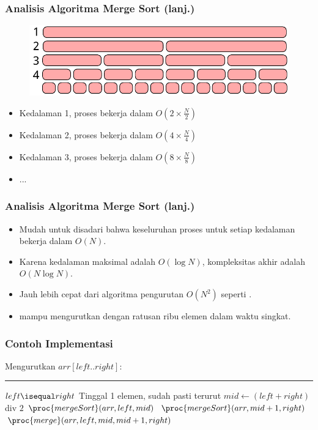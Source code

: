 \begin{frame}
\frametitle{Analisis Algoritma Merge Sort (lanj.)}
\begin{figure}
  \centering
  \includegraphics[width=10 cm]{asset/merge-sort-complexity.pdf}
\end{figure}
\begin{itemize}
  \item Kedalaman 1, proses  bekerja dalam $O(2 \times \frac{N}{2})$
  \item Kedalaman 2, proses  bekerja dalam $O(4 \times \frac{N}{4})$
  \item Kedalaman 3, proses  bekerja dalam $O(8 \times \frac{N}{8})$
  \item ...
\end{itemize}
\end{frame}

\begin{frame}
\frametitle{Analisis Algoritma Merge Sort (lanj.)}
\begin{itemize}
  \item Mudah untuk disadari bahwa keseluruhan proses untuk setiap kedalaman bekerja dalam $O(N)$.
  \item Karena kedalaman maksimal adalah $O(\log{N})$, kompleksitas akhir \fmergeSort adalah $O(N \log{N})$.
  \item Jauh lebih cepat dari algoritma pengurutan $O(N^2)$ seperti .
  \item \fMergeSort mampu mengurutkan \farray dengan ratusan ribu elemen dalam waktu singkat.
\end{itemize}
\end{frame}


\begin{frame}
\frametitle{Contoh Implementasi}
Mengurutkan $arr[left..right]$:
\noindent\rule{10cm}{0.4pt}
\begin{codebox}
\li \If $left \isequal right$ \Then
\li   \Comment Tinggal 1 elemen, sudah pasti terurut
\li \Else
\li   $mid \gets (left + right)$ div $2$
\li   $\proc{mergeSort}(arr, left, mid)$
\li   $\proc{mergeSort}(arr, mid+1, right)$
\li   $\proc{merge}(arr, left, mid, mid+1, right)$
    \End
\end{codebox}
\end{frame}

